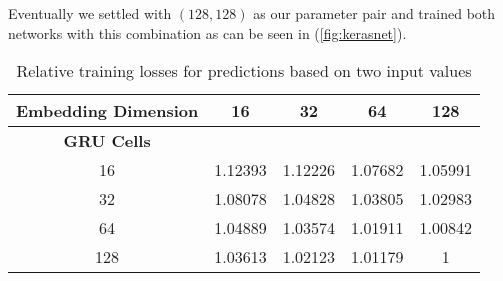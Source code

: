     Eventually we settled with $(128,128)$ as our parameter pair and trained both networks with this combination as
    can be seen in (\ref{fig:kerasnet}).
  
  \begin{table}[htpb]
    \centering
    \label{tab:double}
    \begin{tabular}{| c | c | c | c | c |}
      \hline \textbf{Embedding Dimension}  & 16  & 32  & 64 & 128 \\ \hline
      \textbf{GRU Cells} &  & & & \\
16  &\cellcolor[rgb]{0.9,0.6,0} 1.12393 &\cellcolor[rgb]{0.85,0.65,0} 1.12226 & \cellcolor[rgb]{0.8,0.7,0} 1.07682 & \cellcolor[rgb]{0.75,0.7,0} 1.05991 \\ \hline
32  &\cellcolor[rgb]{0.8,0.65,0} 1.08078 & \cellcolor[rgb]{0.7,0.75,0} 1.04828 & \cellcolor[rgb]{0.7,0.8,0} 1.03805 &  \cellcolor[rgb]{0.6,0.85,0}1.02983 \\ \hline
64  & \cellcolor[rgb]{0.75,0.75,0} 1.04889 & \cellcolor[rgb]{0.65,0.85,0} 1.03574 & \cellcolor[rgb]{0.55,0.9,0} 1.01911 & \cellcolor[rgb]{0.5,0.95,0} 1.00842 \\ \hline
      128 & \cellcolor[rgb]{0.65,0.8,0} 1.03613 & \cellcolor[rgb]{0.6,0.9,0} 1.02123 & \cellcolor[rgb]{0.55,0.95,0} 1.01179 & \cellcolor[rgb]{0.5,1.0,0} 1 \\ \hline

    \end{tabular}
    \caption{Relative training losses for predictions based on two input values}

  \end{table}

    

